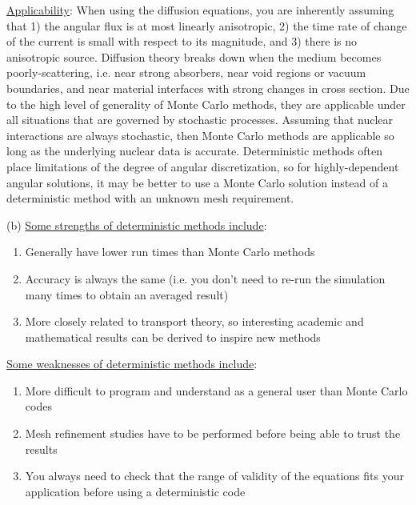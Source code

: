 \documentclass[10pt]{article}
\begin{document}
\underline{Applicability}: When using the diffusion equations, you are inherently assuming that 1) the angular flux is at most linearly anisotropic, 2) the time rate of change of the current is small with respect to its magnitude, and 3) there is no anisotropic source. Diffusion theory breaks down when the medium becomes poorly-scattering, i.e. near strong absorbers, near void regions or vacuum boundaries, and near material interfaces with strong changes in cross section. Due to the high level of generality of Monte Carlo methods, they are applicable under all situations that are governed by stochastic processes. Assuming that nuclear interactions are always stochastic, then Monte Carlo methods are applicable so long as the underlying nuclear data is accurate. Deterministic methods often place limitations of the degree of angular discretization, so for highly-dependent angular solutions, it may be better to use a Monte Carlo solution instead of a deterministic method with an unknown mesh requirement.\newline

(b) \underline{Some strengths of deterministic methods include}:

\begin{enumerate}
\item Generally have lower run times than Monte Carlo methods
\item Accuracy is always the same (i.e. you don't need to re-run the simulation many times to obtain an averaged result)
\item More closely related to transport theory, so interesting academic and mathematical results can be derived to inspire new methods
\end{enumerate} 

\underline{Some weaknesses of deterministic methods include}:

\begin{enumerate}
\item More difficult to program and understand as a general user than Monte Carlo codes
\item Mesh refinement studies have to be performed before being able to trust the results
\item You always need to check that the range of validity of the equations fits your application before using a deterministic code
\end{enumerate}
\end{document}
